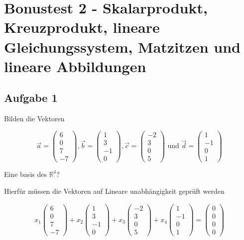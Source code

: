 \chapter{Bonustest 2 - Skalarprodukt, Kreuzprodukt, lineare Gleichungssystem, Matzitzen und lineare Abbildungen}

\section{Aufgabe 1}

Bilden die Vektoren 

\[
\vec{a} = \begin{pmatrix}
    6 \\ 0 \\ 7 \\ -7
\end{pmatrix}, \vec{b} = \begin{pmatrix}
    1 \\3 \\ -1 \\ 0
\end{pmatrix}, \vec{c} = \begin{pmatrix}
    -2 \\ 3 \\ 0 \\ 5
\end{pmatrix} \text{ und } \vec{d} = \begin{pmatrix}
    1 \\ -1 \\ 0 \\ 1
\end{pmatrix}
\]

Eine basis des $\mathbb{R}^4$?

Hierfür müssen die Vektoren auf Lineare unabhängigkeit geprüft werden

\begin{align*}
    x_1 \begin{pmatrix}
        6 \\ 0 \\ 7 \\ -7
    \end{pmatrix} + x_2 \begin{pmatrix}
        1 \\3 \\ -1 \\ 0
    \end{pmatrix} + x_3 \begin{pmatrix}
        -2 \\ 3 \\ 0 \\ 5
    \end{pmatrix} + x_4 \begin{pmatrix}
        1 \\ -1 \\ 0 \\ 1
    \end{pmatrix} = \begin{pmatrix}
        0 \\ 0 \\ 0 \\ 0
    \end{pmatrix}
\end{align*}

